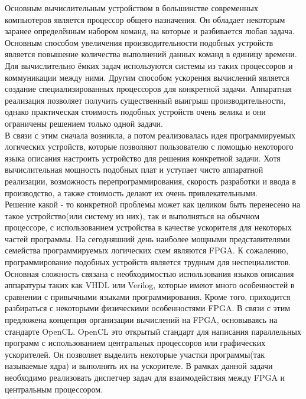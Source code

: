 Основным вычислительным устройством в большинстве современных компьютеров
является процессор общего назначения. Он обладает некоторым
заранее определённым набором команд, на которые и разбивается любая задача.
Основным способом увеличения производительности подобных устройств является
повышение количества выполнений данных команд в единицу времени. Для
вычислительно ёмких задач используются системы из таких процессоров и коммуникации между ними. 
Другим способом ускорения вычислений является создание специализированных
процессоров для конкретной задачи. Аппаратная реализация позволяет получить существенный выигрыш
производительности, однако практическая стоимость подобных устройств очень
велика и они ограничены решением только одной задачи.
\\

 В связи с этим сначала
возникла, а потом реализовалась идея программируемых логических устройств,
которые позволяют пользователю с помощью некоторого языка описания настроить
устройство для решения конкретной задачи. Хотя вычислительная мощность подобных плат и уступает
чисто аппаратной реализации, возможность
перепрограммирования, скорость разработки и ввода в производство, а также
стоимость делают их очень привлекательными.
\\

 Решение какой - то конкретной
проблемы может как целиком быть перенесено на такое устройство(или систему из
них), так и выполняться на обычном процессоре, с использованием устройства в
качестве ускорителя для некоторых частей программы. На сегодняшний день наиболее
мощными представителями семейства программируемых логических схем являются FPGA.
К сожалению, программирование подобных устройств является трудным для
неспециалистов. Основная сложность связана с необходимостью использования языков
описания аппаратуры таких как VHDL или Verilog, которые имеют много особенностей
в сравнении с привычными языками программирования. Кроме того, приходится
разбираться с некоторыми физическими особенностями FPGA. В связи с этим
предложена концепция организации вычислений на FPGA, основываясь на стандарте
OpenCL. OpenCL это открытый стандарт для написания параллельных программ с
использованием центральных процессоров или графических ускорителей. Он позволяет
выделить некоторые участки программы(так называемые ядра) и выполнять их на
ускорителе. В рамках данной задачи необходимо реализовать диспетчер задач для
взаимодействия между FPGA и центральным процессором.

